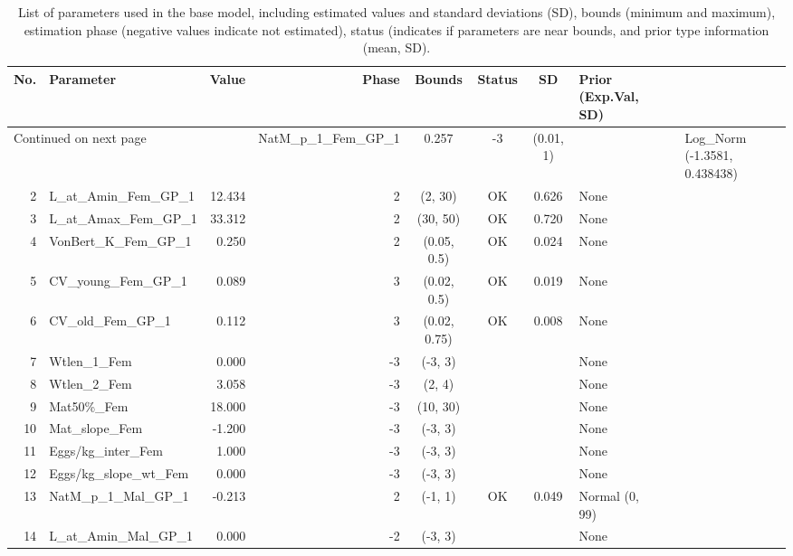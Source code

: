 \documentclass[12pt,]{article}
\begin{document}
\begin{landscape}
\begin{longtable}{rlrrcccl}
\caption{List of parameters used in
                                              the base model, including estimated 
                                              values and standard deviations (SD), 
                                              bounds (minimum and maximum), 
                                              estimation phase (negative values indicate
                                              not estimated), status (indicates if 
                                              parameters are near bounds, and prior type
                                              information (mean, SD).} \\ 
  \hline
No. & Parameter & Value & Phase & Bounds & Status & SD & Prior (Exp.Val, SD)  \\ 
  \hline 
\endhead 
\hline 
\multicolumn{3}{l}{\footnotesize Continued on next page} 
\endfoot 
\endlastfoot 
 \hline
1 & NatM\_p\_1\_Fem\_GP\_1 & 0.257 & -3 & (0.01, 1) &  &  & Log\_Norm (-1.3581, 0.438438) \\ 
  2 & L\_at\_Amin\_Fem\_GP\_1 & 12.434 & 2 & (2, 30) & OK & 0.626 & None \\ 
  3 & L\_at\_Amax\_Fem\_GP\_1 & 33.312 & 2 & (30, 50) & OK & 0.720 & None \\ 
  4 & VonBert\_K\_Fem\_GP\_1 & 0.250 & 2 & (0.05, 0.5) & OK & 0.024 & None \\ 
  5 & CV\_young\_Fem\_GP\_1 & 0.089 & 3 & (0.02, 0.5) & OK & 0.019 & None \\ 
  6 & CV\_old\_Fem\_GP\_1 & 0.112 & 3 & (0.02, 0.75) & OK & 0.008 & None \\ 
  7 & Wtlen\_1\_Fem & 0.000 & -3 & (-3, 3) &  &  & None \\ 
  8 & Wtlen\_2\_Fem & 3.058 & -3 & (2, 4) &  &  & None \\ 
  9 & Mat50\%\_Fem & 18.000 & -3 & (10, 30) &  &  & None \\ 
  10 & Mat\_slope\_Fem & -1.200 & -3 & (-3, 3) &  &  & None \\ 
  11 & Eggs/kg\_inter\_Fem & 1.000 & -3 & (-3, 3) &  &  & None \\ 
  12 & Eggs/kg\_slope\_wt\_Fem & 0.000 & -3 & (-3, 3) &  &  & None \\ 
  13 & NatM\_p\_1\_Mal\_GP\_1 & -0.213 & 2 & (-1, 1) & OK & 0.049 & Normal (0, 99) \\ 
  14 & L\_at\_Amin\_Mal\_GP\_1 & 0.000 & -2 & (-3, 3) &  &  & None \\ 

\end{longtable}
\end{landscape}
\end{document}
